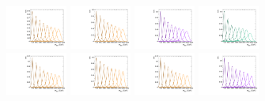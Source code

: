 \begin{figure}[htbp]
  \includegraphics[width=0.18\textwidth]{fig/2Dfit/templateSignalVsMX_fromDC_RadToWW_MVV_mu_LP_nobb_HDy.pdf}
  \includegraphics[width=0.18\textwidth]{fig/2Dfit/templateSignalVsMX_fromDC_ZprToWW_MVV_mu_LP_nobb_HDy.pdf}
  \includegraphics[width=0.18\textwidth]{fig/2Dfit/templateSignalVsMX_fromDC_WprToWZ_MVV_mu_LP_nobb_HDy.pdf}
  \includegraphics[width=0.18\textwidth]{fig/2Dfit/templateSignalVsMX_fromDC_WprToWH_MVV_mu_LP_nobb_HDy.pdf}\\
  \includegraphics[width=0.18\textwidth]{fig/2Dfit/templateSignalVsMX_fromDC_GbuToWW_MVV_mu_HP_vbf_HDy.pdf}
  \includegraphics[width=0.18\textwidth]{fig/2Dfit/templateSignalVsMX_fromDC_RadToWW_MVV_mu_HP_vbf_HDy.pdf}
  \includegraphics[width=0.18\textwidth]{fig/2Dfit/templateSignalVsMX_fromDC_ZprToWW_MVV_mu_HP_vbf_HDy.pdf}
  \includegraphics[width=0.18\textwidth]{fig/2Dfit/templateSignalVsMX_fromDC_WprToWZ_MVV_mu_HP_vbf_HDy.pdf}

\end{figure}
